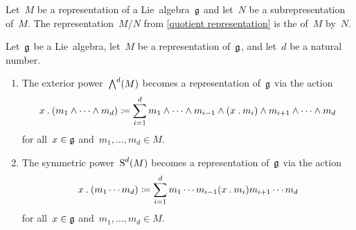\begin{definition}
	Let~$M$ be a representation of a Lie~algebra~$\mathfrak{g}$ and let~$N$ be a subrepresentation of~$M$.
	The representation~$M/N$ from \cref{quotient representation} is the  of~$M$ by~$N$.
\end{definition}


\begin{lemma}
	Let~$\mathfrak{g}$ be a Lie~algebra, let~$M$ be a representation of~$\mathfrak{g}$, and let~$d$ be a natural number.
	\begin{enumerate}
		\item
			The exterior power~$\operatorname{\bigwedge}^d(M)$ becomes a representation of~$\mathfrak{g}$ via the action
			\[
				x \mathbin{.} (m_1 \wedge \dotsb \wedge m_d)
				\coloneqq
				\sum_{i=1}^d
				m_1 \wedge \dotsb \wedge m_{i-1} \wedge (x \mathbin{.} m_i) \wedge m_{i+1} \wedge \dotsb \wedge m_d
			\]
			for all~$x \in \mathfrak{g}$ and~$m_1, \dotsc, m_d \in M$.
		\item
			The symmetric power~$\operatorname{S}^d(M)$ becomes a representation of~$\mathfrak{g}$ via the action
			\[
				x \mathbin{.} (m_1 \dotsm m_d)
				\coloneqq
				\sum_{i=1}^d
				m_1 \dotsm m_{i-1} {} (x \mathbin{.} m_i) {} m_{i+1} \dotsm m_d
			\]
			for all~$x \in \mathfrak{g}$ and~$m_1, \dotsc, m_d \in M$.
	\end{enumerate}
\end{lemma}


